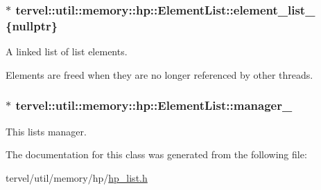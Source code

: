 \subsubsection[{element\+\_\+list\+\_\+}]{$\ast$ tervel\+::util\+::memory\+::hp\+::\+Element\+List\+::element\+\_\+list\+\_\+ \{nullptr\}\hspace{0.3cm}{\ttfamily [private]}}\label{classtervel_1_1util_1_1memory_1_1hp_1_1_element_list_a7522322f344cde24db1524ce4e4666d1}


A linked list of list elements. 

Elements are freed when they are no longer referenced by other threads. \hypertarget{classtervel_1_1util_1_1memory_1_1hp_1_1_element_list_a59a6505303f5914110a624570b5c902d}{}
\subsubsection[{manager\+\_\+}]{$\ast$ tervel\+::util\+::memory\+::hp\+::\+Element\+List\+::manager\+\_\+\hspace{0.3cm}{\ttfamily [private]}}\label{classtervel_1_1util_1_1memory_1_1hp_1_1_element_list_a59a6505303f5914110a624570b5c902d}


This list\textquotesingle{}s manager. 



The documentation for this class was generated from the following file\+:\begin{DoxyCompactItemize}
\item 
tervel/util/memory/hp/\hyperlink{hp__list_8h}{hp\+\_\+list.\+h}\end{DoxyCompactItemize}
